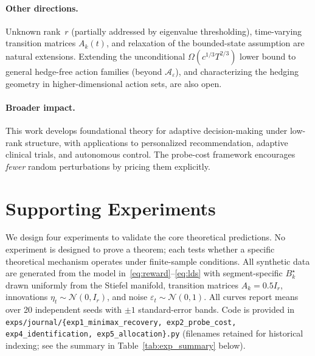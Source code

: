 \documentclass[11pt]{article}
\newcommand{\cA}{\mathcal{A}}
\begin{document}
\paragraph{Other directions.}
Unknown rank~$r$ (partially addressed by eigenvalue thresholding),
time-varying transition matrices $A_k(t)$, and relaxation of the bounded-state
assumption are natural extensions.
Extending the unconditional $\Omega(c^{1/3}T^{2/3})$ lower bound to general
hedge-free action families (beyond $\cA_\varepsilon$), and characterizing
the hedging geometry in higher-dimensional action sets, are also
open.

\paragraph{Broader impact.}
This work develops foundational theory for adaptive decision-making under low-rank
structure, with applications to personalized recommendation, adaptive clinical trials,
and autonomous control.
The probe-cost framework encourages \emph{fewer} random perturbations by pricing them
explicitly.


\section{Supporting Experiments}
\label{sec:experiments}

We design four experiments to validate the core theoretical predictions.
No experiment is designed to prove a theorem; each tests whether a specific
theoretical mechanism operates under finite-sample conditions.
All synthetic data are generated from the model in~\eqref{eq:reward}--\eqref{eq:lds}
with segment-specific $B_k^\star$ drawn uniformly from the Stiefel manifold,
transition matrices $A_k=0.5I_r$, innovations $\eta_t\sim\mathcal{N}(0,I_r)$,
and noise $\varepsilon_t\sim\mathcal{N}(0,1)$.
All curves report means over 20 independent seeds with $\pm 1$ standard-error bands.
Code is provided in \texttt{exps/journal/\{exp1\_minimax\_recovery,
exp2\_probe\_cost, exp4\_identification, exp5\_allocation\}.py}
(filenames retained for historical indexing; see the summary in
Table~\ref{tab:exp_summary} below).
\end{document}
